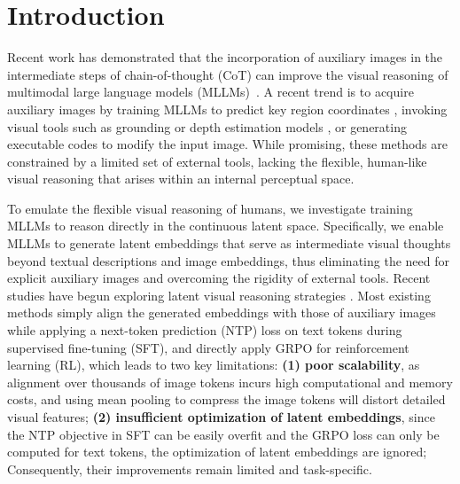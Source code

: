 \section{Introduction}
\label{sec:intro}
Recent work \cite{hu2024visual, zheng2025deepeyes, fan2025grit, Realunify, sarch2025grounded} has demonstrated that the incorporation of auxiliary images in the intermediate steps of chain-of-thought (CoT) can improve the visual reasoning of multimodal large language models (MLLMs)~\cite{comanici2025gemini,bai2025qwen2,wang2025internvl3,mavors, cheng2025visual, jian2025look}. 
A recent trend is to acquire auxiliary images by training MLLMs to predict key region coordinates \citep{zheng2025deepeyes, fu2025refocus, su2025pixel, fan2025grit}, invoking visual tools such as grounding or depth estimation models \citep{hu2024visual, sarch2025grounded, su2025openthinkimg}, or generating executable codes \citep{zhao2025pyvision, zhang2025thyme} to modify the input image. While promising, these methods are constrained by a limited set of external tools, lacking the flexible, human-like visual reasoning that arises within an internal perceptual space. 

To emulate the flexible visual reasoning of humans, we investigate training MLLMs to reason directly in the continuous latent space. Specifically, we enable MLLMs to generate latent embeddings that serve as intermediate visual thoughts beyond textual descriptions and image embeddings, thus eliminating the need for explicit auxiliary images and overcoming the rigidity of external tools. Recent studies have begun exploring latent visual reasoning strategies \citep{yang2025machine, li2025latent, pham2025multimodal}. Most existing methods simply align the generated embeddings with those of auxiliary images while applying a next-token prediction (NTP) loss on text tokens during supervised fine-tuning (SFT), and directly apply GRPO \citep{Shao2024DeepSeekMathPT} for reinforcement learning (RL), which leads to two key limitations: \textbf{(1) poor scalability}, as alignment over thousands of image tokens incurs high computational and memory costs, and using mean pooling to compress the image tokens \citep{yang2025machine} will distort detailed visual features; \textbf{(2) insufficient optimization of latent embeddings}, since the NTP objective in SFT can be easily overfit and the GRPO loss can only be computed for text tokens, the optimization of latent embeddings are ignored; Consequently, their improvements remain limited and task-specific.

